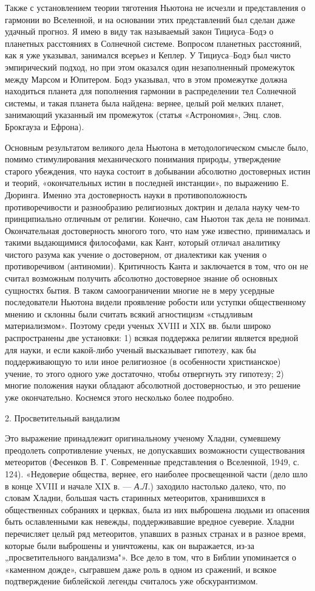 Также с установлением теории тяготения Ньютона не исчезли и представления о
гармонии во Вселенной, и на основании этих представлений был сделан даже
удачный прогноз. Я имею в виду так называемый закон Тициуса--Бодэ о планетных
расстояниях в Солнечной системе. Вопросом планетных расстояний, как я уже
указывал, занимался всерьез и Кеплер. У Тициуса--Бодэ был чисто эмпирический
подход, но при этом оказался один незаполненный промежуток между Марсом и
Юпитером. Бодэ указывал, что в этом промежутке должна находиться планета для
пополнения гармонии в распределении тел Солнечной системы, и такая планета была
найдена: вернее, целый рой мелких планет, занимающий указанный им промежуток
(статья «Астрономия», Энц. слов. Брокгауза и Ефрона).

Основным результатом великого дела Ньютона в методологическом смысле было,
помимо стимулирования механического понимания природы, утверждение старого
убеждения, что наука состоит в добывании абсолютно достоверных истин и теорий,
«окончательных истин в последней инстанции», по выражению Е. Дюринга. Именно
эта достоверность науки в противоположность противоречивости и разнообразию
религиозных доктрин и делала науку чем-то принципиально отличным от религии.
Конечно, сам Ньютон так дела не понимал. Окончательная достоверность многого
того, что нам уже известно, принималась и такими выдающимися философами, как
Кант, который отличал аналитику чистого разума как учение о достоверном, от
диалектики как учения о противоречивом (антиномии). Критичность Канта и
заключается в том, что он не считал возможным получить абсолютно достоверное
знание об основных сущностях бытия. В таком самоограничении многие не в меру
усердные последователи Ньютона видели проявление робости или уступки
общественному мнению и склонны были считать всякий агностицизм «стыдливым
материализмом». Поэтому среди ученых XVIII и XIX вв. были широко распространены
две установки: 1) всякая поддержка религии является вредной для науки, и если
какой-либо ученый высказывает гипотезу, как бы поддерживающую то или иное
религиозное (в особенности христианское) учение, то этого одного уже
достаточно, чтобы отвергнуть эту гипотезу; 2) многие положения науки обладают
абсолютной достоверностью, и это решение уже окончательно. Коснемся этого
несколько более подробно.

2. Просветительный вандализм

Это выражение принадлежит оригинальному ученому Хладни, сумевшему преодолеть
сопротивление ученых, не допускавших возможности существования метеоритов
(Фесенков В. Г. Современные представления о Вселенной, 1949, с. 124).
«Недоверие общества, вернее, его наиболее просвещенной части (дело шло в конце
XVIII и начале XIX в. --- \emph{А.Л.}) заходило настолько далеко, что, по
словам Хладни, большая часть старинных метеоритов, хранившихся в общественных
собраниях и церквах, была из них выброшена людьми из опасения быть ославленными
как невежды, поддерживавшие вредное суеверие. Хладни перечисляет целый ряд
метеоритов, упавших в разных странах и в разное время, которые были выброшены и
уничтожены, как он выражается, из-за „просветительного вандализма"». Все дело в
том, что в Библии упоминается о «каменном дожде», сыгравшем даже роль в одном
из сражений, и всякое подтверждение библейской легенды считалось уже
обскурантизмом.

